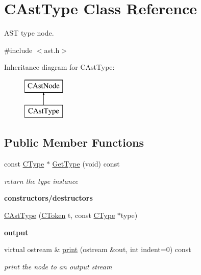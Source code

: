 \hypertarget{classCAstType}{\section{C\-Ast\-Type Class Reference}
\label{classCAstType}
}


A\-S\-T type node.  




{\ttfamily \#include $<$ast.\-h$>$}

Inheritance diagram for C\-Ast\-Type\-:\begin{figure}[H]
\begin{center}
\leavevmode
\includegraphics[height=2.000000cm]{classCAstType}
\end{center}
\end{figure}
\subsection*{Public Member Functions}
\begin{DoxyCompactItemize}
\item 
\hypertarget{classCAstType_afc5d5148f353b15ddc1ad10fefc021fd}{const \hyperlink{classCType}{C\-Type} $\ast$ \hyperlink{classCAstType_afc5d5148f353b15ddc1ad10fefc021fd}{Get\-Type} (void) const }\label{classCAstType_afc5d5148f353b15ddc1ad10fefc021fd}

\begin{DoxyCompactList}\small\item\em return the type instance \end{DoxyCompactList}\end{DoxyCompactItemize}
\begin{Indent}{\bf constructors/destructors}\par
\begin{DoxyCompactItemize}
\item 
\hyperlink{classCAstType_a44f1a8303fc01f11aa849f90f47313f9}{C\-Ast\-Type} (\hyperlink{classCToken}{C\-Token} t, const \hyperlink{classCType}{C\-Type} $\ast$type)
\end{DoxyCompactItemize}
\end{Indent}
\begin{Indent}{\bf output}\par
\begin{DoxyCompactItemize}
\item 
virtual ostream \& \hyperlink{classCAstType_ab546f0715c60e4b1a050981d763c2954}{print} (ostream \&out, int indent=0) const 
\begin{DoxyCompactList}\small\item\em print the node to an output stream \end{DoxyCompactList}\end{DoxyCompactItemize}
\end{Indent}
